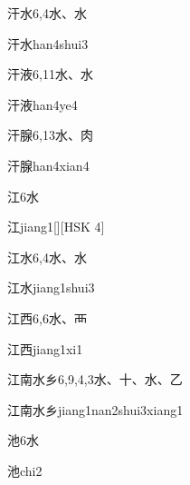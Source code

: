 \begin{entry}{汗水}{6,4}{⽔、⽔}
  \begin{phonetics}{汗水}{han4shui3}
  \end{phonetics}
\end{entry}

\begin{entry}{汗液}{6,11}{⽔、⽔}
  \begin{phonetics}{汗液}{han4ye4}
  \end{phonetics}
\end{entry}

\begin{entry}{汗腺}{6,13}{⽔、⾁}
  \begin{phonetics}{汗腺}{han4xian4}
  \end{phonetics}
\end{entry}

\begin{entry}{江}{6}{⽔}
  \begin{phonetics}{江}{jiang1}[][HSK 4]
  \end{phonetics}
\end{entry}

\begin{entry}{江水}{6,4}{⽔、⽔}
  \begin{phonetics}{江水}{jiang1shui3}
  \end{phonetics}
\end{entry}

\begin{entry}{江西}{6,6}{⽔、⾑}
  \begin{phonetics}{江西}{jiang1xi1}
  \end{phonetics}
\end{entry}

\begin{entry}{江南水乡}{6,9,4,3}{⽔、⼗、⽔、⼄}
  \begin{phonetics}{江南水乡}{jiang1nan2shui3xiang1}
  \end{phonetics}
\end{entry}

\begin{entry}{池}{6}{⽔}
  \begin{phonetics}{池}{chi2}
  \end{phonetics}
\end{entry}

